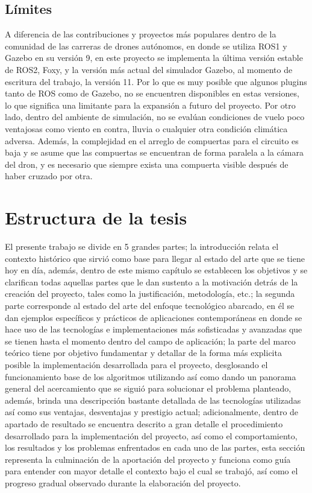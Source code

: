 \subsection{Límites}
A diferencia de las contribuciones y proyectos más populares dentro de la comunidad de las carreras de drones autónomos, en donde se utiliza ROS1 y Gazebo en su versión 9, en este proyecto se implementa la última versión estable de ROS2, Foxy, y la versión más actual del simulador Gazebo, al momento de escritura del trabajo, la versión 11. Por lo que es muy posible que algunos plugins tanto de ROS como de Gazebo, no se encuentren disponibles en estas versiones, lo que significa una limitante para la expansión a futuro del proyecto. Por otro lado, dentro del ambiente de simulación, no se evalúan condiciones de vuelo poco ventajosas como viento en contra, lluvia o cualquier otra condición climática adversa. Además, la complejidad en el arreglo de compuertas para el circuito es baja y se asume que las compuertas se encuentran de forma paralela a la cámara del dron, y  es necesario que siempre exista una compuerta visible después de haber cruzado por otra.


\section{Estructura de la tesis}
El presente trabajo se divide en 5 grandes partes; la introducción relata el contexto histórico que sirvió como base para llegar al estado del arte que se tiene hoy en día, además, dentro de este mismo capítulo se establecen los objetivos y se clarifican todas aquellas partes que le dan sustento a la motivación detrás de la creación del proyecto, tales como la justificación, metodología, etc.; la segunda parte corresponde al estado del arte del enfoque tecnológico abarcado, en él se dan ejemplos específicos y prácticos de aplicaciones contemporáneas en donde se hace uso de las tecnologías e implementaciones más sofisticadas y avanzadas que se tienen hasta el momento dentro del campo de aplicación; la parte del marco teórico tiene por objetivo fundamentar y detallar de la forma más explicita posible la implementación desarrollada para el proyecto, desglosando el funcionamiento base de los algoritmos utilizando así como dando un panorama general del acercamiento que se siguió para solucionar el problema planteado, además, brinda una descripcción bastante detallada de las tecnologías utilizadas así como sus ventajas, desventajas y prestigio actual; adicionalmente, dentro de apartado de resultado se encuentra descrito a gran detalle el procedimiento desarrollado para la implementación del proyecto, así como el comportamiento, los resultados y los problemas enfrentados en cada uno de las partes, esta sección representa la culminación de la aportación del proyecto y funciona como guía para entender con mayor detalle el contexto bajo el cual se trabajó, así como el progreso gradual observado durante la elaboración del proyecto.

